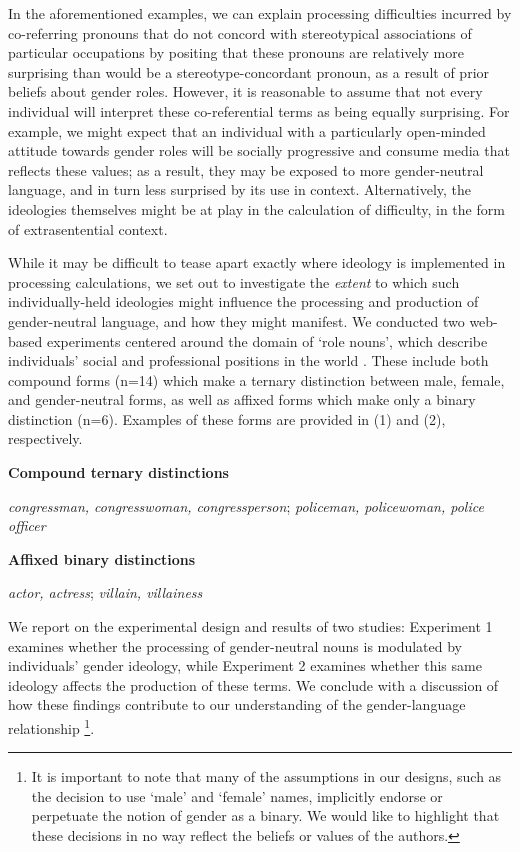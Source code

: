\documentclass[10pt,letterpaper]{article}
\begin{document}
	In the aforementioned examples, we can explain processing difficulties incurred by co-referring pronouns that do not concord with stereotypical associations of particular occupations by positing that these pronouns are relatively more surprising than would be a stereotype-concordant pronoun, as a result of prior beliefs about gender roles. However, it is reasonable to assume that not every individual will interpret these co-referential terms as being equally surprising. For example, we might expect that an individual with a particularly open-minded attitude towards gender roles will be socially progressive and consume media that reflects these values; as a result, they may be exposed to more gender-neutral language, and in turn less surprised by its use in context. Alternatively, the ideologies themselves might be at play in the calculation of difficulty, in the form of extrasentential context. \par 
	While it may be difficult to tease apart exactly where ideology is implemented in processing calculations, we set out to investigate the \textit{extent} to which such individually-held ideologies might influence the processing and production of gender-neutral language, and how they might manifest. We conducted two web-based experiments centered around the domain of `role nouns', which describe individuals' social and professional positions in the world \parencite{misersky2014norms}. These include both compound forms (n=14) which make a ternary distinction between male, female, and gender-neutral forms, as well as affixed forms which make only a binary distinction (n=6). Examples of these forms are provided in (1) and (2), respectively.
	
	\begin{exe}
		\ex \textbf{Compound ternary distinctions}
		\begin{xlist}
			\ex \textit{congressman, congresswoman, congressperson}; \textit{policeman, policewoman, police officer}
		\end{xlist}
		\ex \textbf{Affixed binary distinctions}
		\begin{xlist}
			\ex \textit{actor, actress}; \textit{villain, villainess}
		\end{xlist}
	\end{exe}
	
	We report on the experimental design and results of two studies: Experiment 1 examines whether the processing of gender-neutral nouns is modulated by individuals' gender ideology, while Experiment 2 examines whether this same ideology affects the production of these terms. We conclude with a discussion of how these findings contribute to our understanding of the gender-language relationship \footnote{It is important to note that many of the assumptions in our designs, such as the decision to use `male' and `female' names, implicitly endorse or perpetuate the notion of gender as a binary. We would like to highlight that these decisions in no way reflect the beliefs or values of the authors.}.\par 
	
\end{document}
